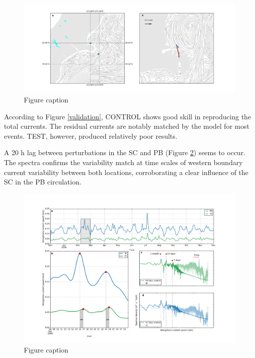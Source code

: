 \documentclass[final]{beamer}
\newlength{\onecolwid}
\newlength{\twocolwid}
\begin{document}
\begin{frame}[t]
\begin{columns}[t]
\begin{column}{\twocolwid}
\begin{columns}[t,totalwidth=\twocolwid]
\begin{column}{\onecolwid}
\begin{block}
            \begin{figure}
            \includegraphics[width=1.0\linewidth]{mean_flow.png}
            \caption{\label{mean_flow} Figure caption}
            \end{figure}

            According to Figure \ref{validation}, CONTROL shows good skill in reproducing the total currents. The residual currents are notably matched by the model for most events. TEST, however, produced relatively poor results.

            A 20 h lag between perturbations in the SC and PB (Figure \ref{spectra}) seems to occur. The spectra confirms the variability match at time scales of western boundary current variability between both locations, corroborating a clear influence of the SC in the PB circulation. 

            \begin{figure}
            \includegraphics[width=1.0\linewidth]{pb-sc_5day-lowpass_time-series.png}
            \caption{\label{spectra} Figure caption}
            \end{figure}


\end{block}
\end{column}
\end{columns}
\end{column}
\end{columns}
\end{frame}
\end{document}
